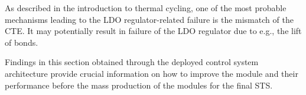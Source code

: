 As described in the introduction to thermal cycling, one of the most probable mechanisms leading to the \gls{LDO} regulator-related failure is the mismatch of the \gls{CTE}. It may potentially result in failure of the \gls{LDO} regulator due to e.g., the lift of bonds.

Findings in this section obtained through the deployed control system architecture provide crucial information on how to improve the module and their performance before the mass production of the modules for the final \gls{STS}. 



\newpage